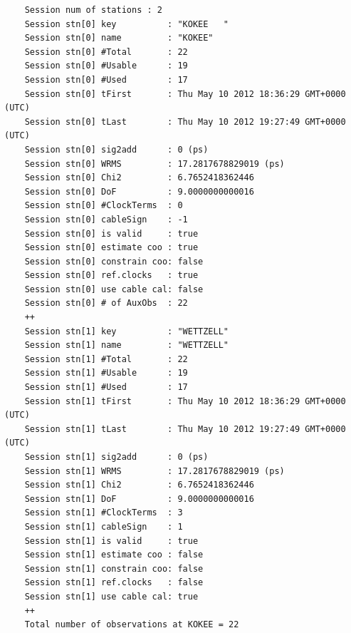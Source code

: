 \documentclass [10pt,letterpaper]{report}
\begin{document}
{\small\begin{verbatim}
    Session num of stations : 2
    Session stn[0] key          : "KOKEE   "
    Session stn[0] name         : "KOKEE"
    Session stn[0] #Total       : 22
    Session stn[0] #Usable      : 19
    Session stn[0] #Used        : 17
    Session stn[0] tFirst       : Thu May 10 2012 18:36:29 GMT+0000 (UTC)
    Session stn[0] tLast        : Thu May 10 2012 19:27:49 GMT+0000 (UTC)
    Session stn[0] sig2add      : 0 (ps)
    Session stn[0] WRMS         : 17.2817678829019 (ps)
    Session stn[0] Chi2         : 6.7652418362446
    Session stn[0] DoF          : 9.0000000000016
    Session stn[0] #ClockTerms  : 0
    Session stn[0] cableSign    : -1
    Session stn[0] is valid     : true
    Session stn[0] estimate coo : true
    Session stn[0] constrain coo: false
    Session stn[0] ref.clocks   : true
    Session stn[0] use cable cal: false
    Session stn[0] # of AuxObs  : 22
    ++
    Session stn[1] key          : "WETTZELL"
    Session stn[1] name         : "WETTZELL"
    Session stn[1] #Total       : 22
    Session stn[1] #Usable      : 19
    Session stn[1] #Used        : 17
    Session stn[1] tFirst       : Thu May 10 2012 18:36:29 GMT+0000 (UTC)
    Session stn[1] tLast        : Thu May 10 2012 19:27:49 GMT+0000 (UTC)
    Session stn[1] sig2add      : 0 (ps)
    Session stn[1] WRMS         : 17.2817678829019 (ps)
    Session stn[1] Chi2         : 6.7652418362446
    Session stn[1] DoF          : 9.0000000000016
    Session stn[1] #ClockTerms  : 3
    Session stn[1] cableSign    : 1
    Session stn[1] is valid     : true
    Session stn[1] estimate coo : false
    Session stn[1] constrain coo: false
    Session stn[1] ref.clocks   : false
    Session stn[1] use cable cal: true
    ++
    Total number of observations at KOKEE = 22
\end{verbatim}}
\end{document}
